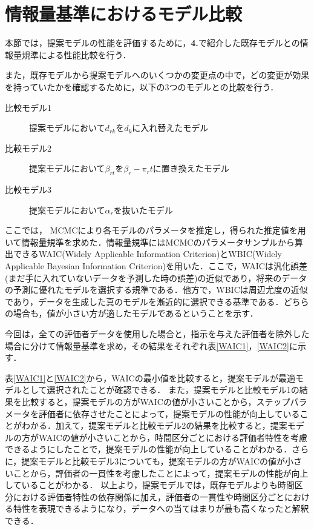 \documentclass[a4paper,11pt,oneside,openany]{jsbook}
\begin{document}
\section{情報量基準におけるモデル比較}
本節では，提案モデルの性能を評価するために，\textbf{4.}で紹介した既存モデルとの情報量規準による性能比較を行う．

また，既存モデルから提案モデルへのいくつかの変更点の中で，どの変更が効果を持っていたかを確認するために，以下の3つのモデルとの比較を行う．

\begin{description}
\item [比較モデル1]提案モデルにおいて$d_{rk}$を$d_k$に入れ替えたモデル
\item [比較モデル2]提案モデルにおいて$\beta_{rt}$を$\beta_{r} - \pi_{r}t$に置き換えたモデル
\item [比較モデル3]提案モデルにおいて$\alpha_r$を抜いたモデル
\end{description}

ここでは， MCMCにより各モデルのパラメータを推定し，得られた推定値を用いて情報量規準を求めた．情報量規準にはMCMCのパラメータサンプルから算出できるWAIC(Widely Applicable Information Criterion)とWBIC(Widely Applicable Bayesian Information Criterion)を用いた．ここで，WAICは汎化誤差(まだ手に入れていないデータを予測した時の誤差)の近似であり，将来のデータの予測に優れたモデルを選択する規準である．他方で，WBICは周辺尤度の近似であり，データを生成した真のモデルを漸近的に選択できる基準である．どちらの場合も，値が小さい方が適したモデルであるということを示す．

今回は，全ての評価者データを使用した場合と，指示を与えた評価者を除外した場合に分けて情報量基準を求め，その結果をそれぞれ表\ref{WAIC1}，\ref{WAIC2}に示す．

表\ref{WAIC1}と\ref{WAIC2}から，WAICの最小値を比較すると，提案モデルが最適モデルとして選択されたことが確認できる．
また，提案モデルと比較モデル1の結果を比較すると，提案モデルの方がWAICの値が小さいことから，ステップパラメータを評価者に依存させたことによって，提案モデルの性能が向上していることがわかる．加えて，提案モデルと比較モデル2の結果を比較すると，提案モデルの方がWAICの値が小さいことから，時間区分ごとにおける評価者特性を考慮できるようにしたことで，提案モデルの性能が向上していることがわかる．さらに，提案モデルと比較モデル3についても，提案モデルの方がWAICの値が小さいことから，評価者の一貫性を考慮したことによって，提案モデルの性能が向上していることがわかる．
以上より，提案モデルでは，既存モデルよりも時間区分における評価者特性の依存関係に加え，評価者の一貫性や時間区分ごとにおける特性を表現できるようになり，データへの当てはまりが最も高くなったと解釈できる．
\end{document}
